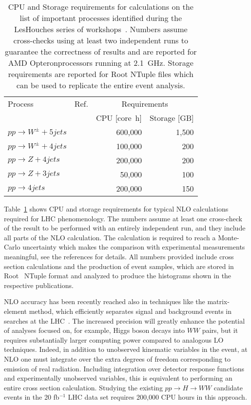 \begin{table}
  \centering
  \begin{tabular}{llrr}
    \hline
    Process & Ref. & \multicolumn{2}{c}{Requirements}\\
    & & CPU [core~h] & Storage [GB] \\
    \hline\hline
    $pp\to W^\pm+5 jets$ & \cite{Bern:2013gka} & 600,000 & 1,500 \\
    $pp\to W^\pm+4 jets$ & \cite{Berger:2010zx} & 100,000 & 200\\
    $pp\to Z+4 jets$ & \cite{Ita:2011wn} & 200,000 & 200\\
    $pp\to Z+3 jets$ & \cite{Berger:2010vm} & 50,000 & 100 \\
    $pp\to 4 jets$ & \cite{Bern:2011ep} & 200,000 & 150\\
    \hline
  \end{tabular}
  \caption{CPU and Storage requirements for calculations on the
    list of important processes identified during the LesHouches
    series of workshops~\cite{AlcarazMaestre:2012vp}.
    Numbers assume cross-checks using at least
    two independent runs to guarantee the correctness of results
    and are reported for AMD Opteron\trademark processors running at 2.1~GHz.
    Storage requirements are reported for Root NTuple files which can be used
    to replicate the entire event analysis.
  \label{tab:nlo_wishlist}}
\end{table}

Table~\ref{tab:nlo_wishlist} shows CPU and storage requirements for 
typical NLO calculations required for LHC phenomenology. The numbers assume
at least one cross-check of the result to be performed with an entirely
independent run, and they include all parts of the NLO calculation.
The calculation is required to reach a Monte-Carlo uncertainty which makes 
the comparison with experimental measurements meaningful, see the
references for details. All numbers provided include cross section
calculations and the production of event samples, which are stored
in Root~\cite{Brun:1997pa} NTuple format and analyzed to produce the
histograms shown in the respective publications.

NLO accuracy has been recently reached also in techniques like the 
matrix-element method, which efficiently separates signal and background
events in searches at the LHC~\cite{Campbell:2012cz}.
The increased precision will greatly enhance the potential of analyses
focused on, for example, Higgs boson decays into $WW$ pairs, 
but it requires substantially larger computing power compared
to analogous LO techniques. Indeed, in addition to unobserved kinematic 
variables in the event, at NLO one must integrate over the extra degrees 
of freedom corresponding to emission of real radiation. 
Including integration over detector response functions and experimentally 
unobserved variables, this is equivalent to performing an entire 
cross section calculation. Studying the existing $pp\to H\to WW$ 
candidate events in the 20 fb$^{-1}$ LHC data set requires 200,000 
CPU hours in this approach.

